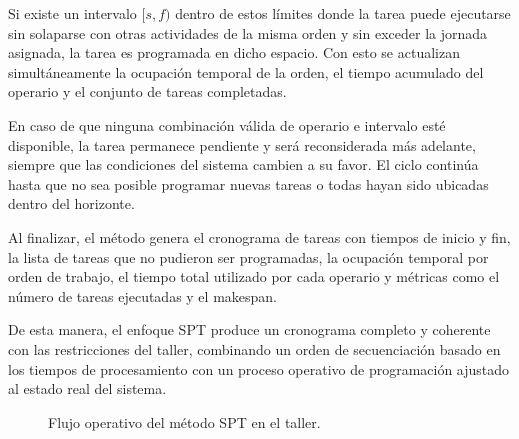 Si existe un intervalo $[s, f)$ dentro de estos límites donde la tarea puede ejecutarse sin 
solaparse con otras actividades de la misma orden y sin exceder la jornada asignada, la 
tarea es programada en dicho espacio. Con esto se actualizan simultáneamente la ocupación 
temporal de la orden, el tiempo acumulado del operario y el conjunto de tareas 
completadas.

En caso de que ninguna combinación válida de operario e intervalo esté disponible, la tarea 
permanece pendiente y será reconsiderada más adelante, siempre que las condiciones del 
sistema cambien a su favor. El ciclo continúa hasta que no sea posible programar nuevas 
tareas o todas hayan sido ubicadas dentro del horizonte.

Al finalizar, el método genera el cronograma de tareas con tiempos de inicio y fin, la 
lista de tareas que no pudieron ser programadas, la ocupación temporal por orden de 
trabajo, el tiempo total utilizado por cada operario y métricas como el número de tareas 
ejecutadas y el makespan.

De esta manera, el enfoque SPT produce un cronograma completo y coherente con las 
restricciones del taller, combinando un orden de secuenciación basado en los tiempos de 
procesamiento con un proceso operativo de programación ajustado al estado real del sistema.

\begin{figure}[H]
\centering
\shorthandoff{>}%
%
\shorthandon{>}
\caption{Flujo operativo del método SPT en el taller.}
\end{figure}


